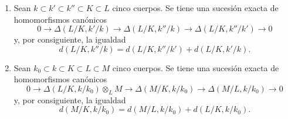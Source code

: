 \begin{proposition}[21.6.4]
\label{0.21.6.4-fr}
\begin{enumerate}
  \item[\rm (i)] Sean $k\subset k'\subset k''\subset K\subset L$ cinco cuerpos.
  Se tiene una sucesión exacta de homomorfismos canónicos
\begin{equation}
\tag{21.6.4.1}
\label{0.21.6.4.1-fr}
0\to\Delta(L/K,k'/k)\to\Delta(L/K,k''/k)\to\Delta(L/K,k''/k')\to0
\end{equation}
y, por consiguiente, la igualdad
\begin{equation}
\tag{21.6.4.2}
\label{0.21.6.4.2-fr}
d(L/K,k''/k)=d(L/K,k''/k')+d(L/K,k'/k).
\end{equation}
  \item[\rm (ii)] Sean $k_0\subset k\subset K\subset L\subset M$ cinco cuerpos.
  Se tiene una sucesión exacta de homomorfismos canónicos
\begin{equation}
\tag{21.6.4.3}
\label{0.21.6.4.3-fr}
0\to\Delta(L/K,k/k_0)\otimes_LM\to\Delta(M/K,k/k_0)
\to\Delta(M/L,k/k_0)\to0
\end{equation}
y, por consiguiente, la igualdad
\begin{equation}
\tag{21.6.4.4}
\label{0.21.6.4.4-fr}
d(M/K,k/k_0)=d(M/L,k/k_0)+d(L/K,k/k_0).
\end{equation}
\end{enumerate}
\end{proposition}

